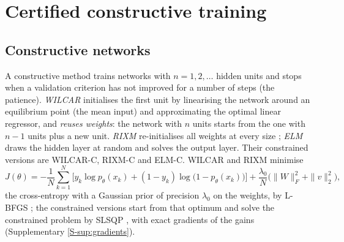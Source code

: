 \documentclass[preprint,12pt,authoryear]{elsarticle}
\begin{document}
\section{Certified constructive training}\label{sec:method}

\subsection{Constructive networks}\label{sec:constructive}
A constructive method trains networks with $n=1,2,\dots$ hidden units and stops when a validation criterion has not
improved for a number of steps (the patience). \emph{WILCAR} \citep{Sa2022,Fontes2021} initialises the first unit by
linearising the network around an equilibrium point (the mean input) and approximating the optimal linear regressor,
and \emph{reuses weights}: the network with $n$ units starts from the one with $n-1$ units plus a new unit. \emph{RIXM}
re-initialises all weights at every size \citep{Glorot2010}; \emph{ELM} \citep{Huang2006} draws the hidden layer at random
and solves the output layer. Their constrained versions are WILCAR-C, RIXM-C and ELM-C. WILCAR and RIXM minimise
\begin{equation}\label{eq:loss}
J(\theta)=-\frac1N\sum_{k=1}^{N}\bigl[y_k\log p_\theta(x_k)+(1-y_k)\log\bigl(1-p_\theta(x_k)\bigr)\bigr]
+\frac{\lambda_0}{N}\bigl(\|W\|_F^2+\|v\|_2^2\bigr),
\end{equation}
the cross-entropy with a Gaussian prior of precision $\lambda_0$ on the weights, by L-BFGS \citep{LiuNocedal1989}; the
constrained versions start from that optimum and solve the constrained problem by SLSQP \citep{Kraft1994}, with exact
gradients of the gains (Supplementary \cref{S-sup:gradients}).
\end{document}
